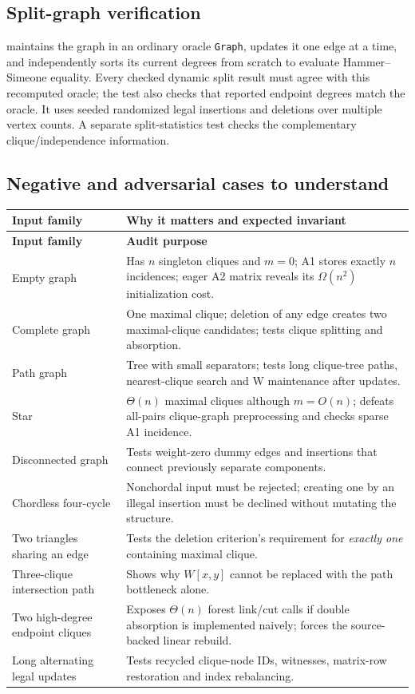 \subsection{Split-graph verification}
 maintains the graph in an ordinary oracle \texttt{Graph}, updates it one edge at a time, and independently sorts its current degrees from scratch to evaluate Hammer--Simeone equality.  Every checked dynamic split result must agree with this recomputed oracle; the test also checks that reported endpoint degrees match the oracle.  It uses seeded randomized legal insertions and deletions over multiple vertex counts.  A separate split-statistics test checks the complementary clique/independence information.

\subsection{Negative and adversarial cases to understand}
\begin{longtable}{p{}p{}}
\toprule
\textbf{Input family} & \textbf{Why it matters and expected invariant}\\\midrule\endfirsthead
\toprule\textbf{Input family}&\textbf{Audit purpose}\\\midrule\endhead
Empty graph & Has \(n\) singleton cliques and \(m=0\); A1 stores exactly \(n\) incidences; eager A2 matrix reveals its \(\Omega(n^2)\) initialization cost.\\
Complete graph & One maximal clique; deletion of any edge creates two maximal-clique candidates; tests clique splitting and absorption.\\
Path graph & Tree with small separators; tests long clique-tree paths, nearest-clique search and W maintenance after updates.\\
Star & \(\Theta(n)\) maximal cliques although \(m=O(n)\); defeats all-pairs clique-graph preprocessing and checks sparse A1 incidence.\\
Disconnected graph & Tests weight-zero dummy edges and insertions that connect previously separate components.\\
Chordless four-cycle & Nonchordal input must be rejected; creating one by an illegal insertion must be declined without mutating the structure.\\
Two triangles sharing an edge & Tests the deletion criterion's requirement for \emph{exactly one} containing maximal clique.\\
Three-clique intersection path & Shows why \(W[x,y]\) cannot be replaced with the path bottleneck alone.\\
Two high-degree endpoint cliques & Exposes \(\Theta(n)\) forest link/cut calls if double absorption is implemented naively; forces the source-backed linear rebuild.\\
Long alternating legal updates & Tests recycled clique-node IDs, witnesses, matrix-row restoration and index rebalancing.\\
\bottomrule
\end{longtable}

